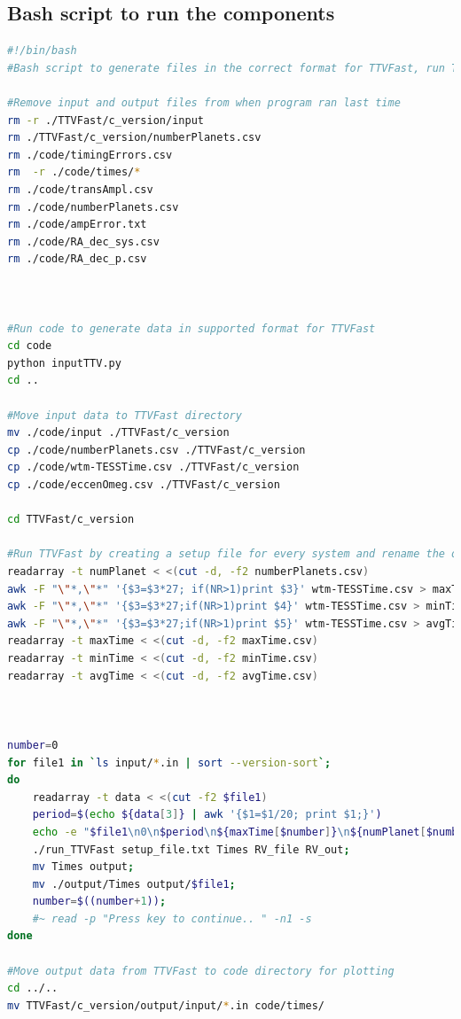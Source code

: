 \documentclass[12pt]{report}
\begin{document}



\begin{appendix}

\chapter{Bash script to run the components}
\begin{lstlisting}[language=Bash]
#!/bin/bash
#Bash script to generate files in the correct format for TTVFast, run TTVFast and plot the results

#Remove input and output files from when program ran last time
rm -r ./TTVFast/c_version/input
rm ./TTVFast/c_version/numberPlanets.csv
rm ./code/timingErrors.csv
rm  -r ./code/times/*
rm ./code/transAmpl.csv
rm ./code/numberPlanets.csv
rm ./code/ampError.txt
rm ./code/RA_dec_sys.csv
rm ./code/RA_dec_p.csv



#Run code to generate data in supported format for TTVFast
cd code
python inputTTV.py
cd ..

#Move input data to TTVFast directory
mv ./code/input ./TTVFast/c_version
cp ./code/numberPlanets.csv ./TTVFast/c_version
cp ./code/wtm-TESSTime.csv ./TTVFast/c_version
cp ./code/eccenOmeg.csv ./TTVFast/c_version

cd TTVFast/c_version

#Run TTVFast by creating a setup file for every system and rename the output file to the number of the system
readarray -t numPlanet < <(cut -d, -f2 numberPlanets.csv)
awk -F "\"*,\"*" '{$3=$3*27; if(NR>1)print $3}' wtm-TESSTime.csv > maxTime.csv
awk -F "\"*,\"*" '{$3=$3*27;if(NR>1)print $4}' wtm-TESSTime.csv > minTime.csv
awk -F "\"*,\"*" '{$3=$3*27;if(NR>1)print $5}' wtm-TESSTime.csv > avgTime.csv
readarray -t maxTime < <(cut -d, -f2 maxTime.csv)
readarray -t minTime < <(cut -d, -f2 minTime.csv)
readarray -t avgTime < <(cut -d, -f2 avgTime.csv)



number=0
for file1 in `ls input/*.in | sort --version-sort`;
do
	readarray -t data < <(cut -f2 $file1)
	period=$(echo ${data[3]} | awk '{$1=$1/20; print $1;}')
	echo -e "$file1\n0\n$period\n${maxTime[$number]}\n${numPlanet[$number]}\n0" > setup_file.txt;  		#${maxTime[$number]}
	./run_TTVFast setup_file.txt Times RV_file RV_out;
	mv Times output;
	mv ./output/Times output/$file1;
	number=$((number+1));
	#~ read -p "Press key to continue.. " -n1 -s
done

#Move output data from TTVFast to code directory for plotting
cd ../..
mv TTVFast/c_version/output/input/*.in code/times/


\end{lstlisting}
\end{appendix}
\end{document}
